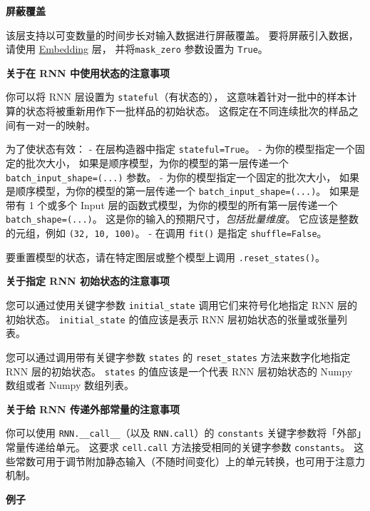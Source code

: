 \textbf{屏蔽覆盖}

该层支持以可变数量的时间步长对输入数据进行屏蔽覆盖。
要将屏蔽引入数据，请使用 \href{embeddings.md}{Embedding} 层，
并将\texttt{mask\_zero} 参数设置为 \texttt{True}。

\textbf{关于在 RNN 中使用状态的注意事项}

你可以将 RNN 层设置为 \texttt{stateful}（有状态的），
这意味着针对一批中的样本计算的状态将被重新用作下一批样品的初始状态。
这假定在不同连续批次的样品之间有一对一的映射。

为了使状态有效： - 在层构造器中指定 \texttt{stateful=True}。 -
为你的模型指定一个固定的批次大小，
如果是顺序模型，为你的模型的第一层传递一个
\texttt{batch\_input\_shape=(...)} 参数。 -
为你的模型指定一个固定的批次大小，
如果是顺序模型，为你的模型的第一层传递一个
\texttt{batch\_input\_shape=(...)}。 如果是带有 1 个或多个 Input
层的函数式模型，为你的模型的所有第一层传递一个
\texttt{batch\_shape=(...)}。
这是你的输入的预期尺寸，\emph{包括批量维度}。 它应该是整数的元组，例如
\texttt{(32,\ 10,\ 100)}。 - 在调用 \texttt{fit()} 是指定
\texttt{shuffle=False}。

要重置模型的状态，请在特定图层或整个模型上调用
\texttt{.reset\_states()}。

\textbf{关于指定 RNN 初始状态的注意事项}

您可以通过使用关键字参数 \texttt{initial\_state} 调用它们来符号化地指定
RNN 层的初始状态。 \texttt{initial\_state} 的值应该是表示 RNN
层初始状态的张量或张量列表。

您可以通过调用带有关键字参数 \texttt{states} 的 \texttt{reset\_states}
方法来数字化地指定 RNN 层的初始状态。 \texttt{states} 的值应该是一个代表
RNN 层初始状态的 Numpy 数组或者 Numpy 数组列表。

\textbf{关于给 RNN 传递外部常量的注意事项}

你可以使用 \texttt{RNN.\_\_call\_\_}（以及 \texttt{RNN.call}）的
\texttt{constants} 关键字参数将「外部」常量传递给单元。 这要求
\texttt{cell.call} 方法接受相同的关键字参数 \texttt{constants}。
这些常数可用于调节附加静态输入（不随时间变化）上的单元转换，也可用于注意力机制。

\textbf{例子}

